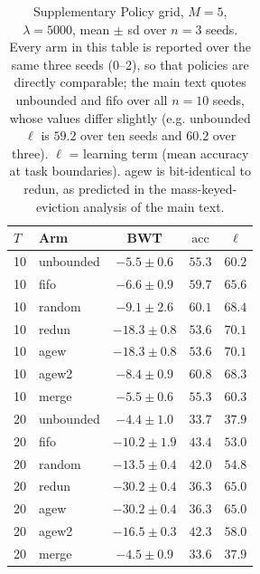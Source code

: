 \documentclass[11pt]{article}
\newcommand{\acc}{\mathrm{acc}}
\begin{document}
\begin{table}[htbp]
\centering\small
\caption{Supplementary Policy grid, $M{=}5$, $\lambda{=}5000$, mean $\pm$ sd over
$n{=}3$ seeds. Every arm in this table is reported over the same three
seeds (0--2), so that policies are directly comparable; the main text
quotes unbounded and fifo over all $n{=}10$ seeds, whose values differ
slightly (e.g. unbounded $\ell$ is $59.2$ over ten seeds and $60.2$ over
three). $\ell$ = learning term (mean accuracy at task boundaries). agew is
bit-identical to redun, as predicted in the mass-keyed-eviction analysis
of the main text.}
\label{tab:supp-grid}
\begin{tabular}{llccc}
\toprule
$T$ & Arm & BWT & $\acc$ & $\ell$ \\
\midrule
10 & unbounded & $-5.5\pm0.6$   & $55.3$ & $60.2$ \\
10 & fifo      & $-6.6\pm0.9$   & $59.7$ & $65.6$ \\
10 & random    & $-9.1\pm2.6$   & $60.1$ & $68.4$ \\
10 & redun     & $-18.3\pm0.8$  & $53.6$ & $70.1$ \\
10 & agew      & $-18.3\pm0.8$  & $53.6$ & $70.1$ \\
10 & agew2     & $-8.4\pm0.9$   & $60.8$ & $68.3$ \\
10 & merge     & $-5.5\pm0.6$   & $55.3$ & $60.3$ \\
\midrule
20 & unbounded & $-4.4\pm1.0$   & $33.7$ & $37.9$ \\
20 & fifo      & $-10.2\pm1.9$  & $43.4$ & $53.0$ \\
20 & random    & $-13.5\pm0.4$  & $42.0$ & $54.8$ \\
20 & redun     & $-30.2\pm0.4$  & $36.3$ & $65.0$ \\
20 & agew      & $-30.2\pm0.4$  & $36.3$ & $65.0$ \\
20 & agew2     & $-16.5\pm0.3$  & $42.3$ & $58.0$ \\
20 & merge     & $-4.5\pm0.9$   & $33.6$ & $37.9$ \\
\bottomrule
\end{tabular}
\end{table}
\end{document}

